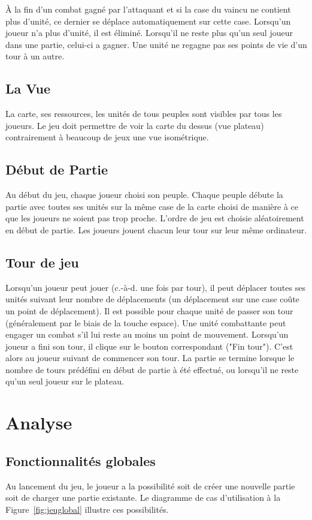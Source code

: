 \documentclass[a4paper]{article}%
\begin{document}
À la fin d’un combat gagné par l’attaquant et si la case du vaincu ne contient plus d’unité, ce dernier se déplace automatiquement sur cette case. Lorsqu’un joueur n’a plus d’unité, il est éliminé. Lorsqu’il ne reste plus qu’un seul joueur dans une partie, celui-ci a gagner. Une unité ne regagne pas ses points de vie d’un tour à un autre.

\subsection{La Vue}
La carte, ses ressources, les unités de tous peuples sont visibles par tous les joueurs. Le jeu doit permettre de voir la carte du dessus (vue plateau) contrairement à beaucoup de jeux  
une vue isométrique.

\subsection{Début de Partie}
Au début du jeu, chaque joueur choisi son peuple. Chaque peuple débute la partie avec toutes ses unités sur la même case de la carte choisi de manière à ce que les joueurs ne soient pas trop proche. L’ordre de jeu est choisie aléatoirement en début de partie. Les joueurs jouent chacun leur tour sur leur même ordinateur.

\subsection{Tour de jeu}
\label{tourdejeu}
Lorsqu’un joueur peut jouer (c.-à-d. une fois par tour), il peut déplacer toutes ses unités suivant leur nombre de déplacements (un déplacement sur une case coûte un point de déplacement). Il est possible pour chaque unité de passer son tour (généralement par le biais de la touche espace). Une unité combattante peut engager un combat s’il lui reste au moins un point de mouvement. Lorsqu’un joueur a fini son tour, il clique sur le bouton correspondant ("Fin tour"). C’est alors au joueur suivant de commencer son tour. La partie se termine lorsque le nombre de tours prédéfini en début de partie à été effectué, ou lorsqu’il ne reste qu’un seul joueur sur le plateau.


\section{Analyse}
\label{debut}
\subsection{Fonctionnalités globales}
Au lancement du jeu, le joueur a la possibilité soit de créer une nouvelle partie soit de charger une partie existante. Le diagramme de cas d'utilisation à la Figure~\ref{fig:jeuglobal} illustre ces possibilités.
\end{document}
